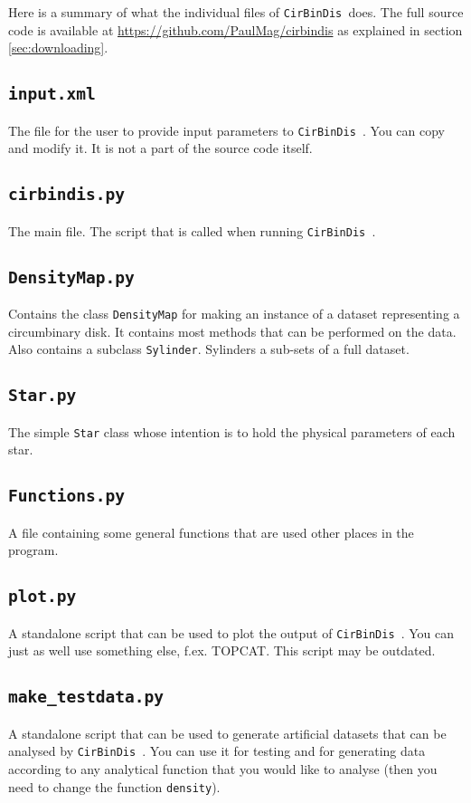 \documentclass[a4paper, 12pt, english, titlepage]{article}
\newcommand{\sname}{\texttt{CirBinDis }}
\begin{document}
Here is a summary of what the individual files of \sname does.
The full source code is available at \url{https://github.com/PaulMag/cirbindis} as explained in section \vref{sec:downloading}.

\subsection{\texttt{input.xml}}
    The file for the user to provide input parameters to \sname. You can copy and modify it. It is not a part of the source code itself.

\subsection{\texttt{cirbindis.py}}
    The main file.
    The script that is called when running \sname.

\subsection{\texttt{DensityMap.py}}
    Contains the class \texttt{DensityMap} for making an instance of a dataset representing a circumbinary disk. It contains most methods that can be performed on the data. Also contains a subclass \texttt{Sylinder}. Sylinders a sub-sets of a full dataset.

\subsection{\texttt{Star.py}}
    The simple \texttt{Star} class whose intention is to hold the physical parameters of each star.

\subsection{\texttt{Functions.py}}
    A file containing some general functions that are used other places in the program.

\subsection{\texttt{plot.py}}
    A standalone script that can be used to plot the output of \sname. You can just as well use something else, f.ex. TOPCAT. This script may be outdated.

\subsection{\texttt{make\_testdata.py}}
    A standalone script that can be used to generate artificial datasets that can be analysed by \sname. You can use it for testing and for generating data according to any analytical function that you would like to analyse (then you need to change the function \texttt{density}).
\end{document}
